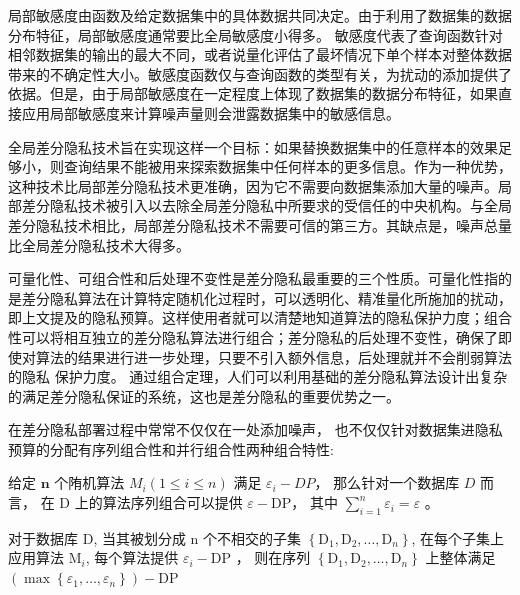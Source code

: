 局部敏感度由函数及给定数据集中的具体数据共同决定。由于利用了数据集的数据分布特征，局部敏感度通常要比全局敏感度小得多。
敏感度代表了查询函数针对相邻数据集的输出的最大不同，或者说量化评估了最坏情况下单个样本对整体数据带来的不确定性大小。敏感度函数仅与查询函数的类型有关，为扰动的添加提供了依据。但是，由于局部敏感度在一定程度上体现了数据集的数据分布特征，如果直接应用局部敏感度来计算噪声量则会泄露数据集中的敏感信息。

全局差分隐私技术旨在实现这样一个目标：如果替换数据集中的任意样本的效果足够小，则查询结果不能被用来探索数据集中任何样本的更多信息。作为一种优势，这种技术比局部差分隐私技术更准确，因为它不需要向数据集添加大量的噪声。局部差分隐私技术被引入以去除全局差分隐私中所要求的受信任的中央机构。与全局差分隐私技术相比，局部差分隐私技术不需要可信的第三方。其缺点是，噪声总量比全局差分隐私技术大得多。

可量化性、可组合性和后处理不变性是差分隐私最重要的三个性质。可量化性指的是差分隐私算法在计算特定随机化过程时，可以透明化、精准量化所施加的扰动，即上文提及的隐私预算。这样使用者就可以清楚地知道算法的隐私保护力度；组合性可以将相互独立的差分隐私算法进行组合；差分隐私的后处理不变性，确保了即使对算法的结果进行进一步处理，只要不引入额外信息，后处理就并不会削弱算法的隐私
保护力度。 通过组合定理，人们可以利用基础的差分隐私算法设计出复杂的满足差分隐私保证的系统，这也是差分隐私的重要优势之一。 

在差分隐私部署过程中常常不仅仅在一处添加噪声， 也不仅仅针对数据集进隐私预算的分配有序列组合性和并行组合性两种组合特性:

\begin{theorem}[串行组合]\label{串行组合}
给定 $\mathbf{n}$ 个陏机算法 $M_{i}(1 \leq i \leq n)$ 满足 $\varepsilon_{i}-DP$， 那么针对一个数据库 $D$ 而言， 在 $\mathrm{D}$ 上的算法序列组合可以提供 $\varepsilon-\mathrm{DP}$， 其中 $\sum_{i=1}^{n} \varepsilon_{i}=\varepsilon$ 。
\end{theorem}

\begin{theorem}[并行组合]\label{并行组合}
对于数据库 $\mathrm{D}$, 当其被划分成 $\mathrm{n}$ 个不相交的子集 $\left\{\mathrm{D}_{1}, \mathrm{D}_{2}, \ldots, \mathrm{D}_{n}\right\}$, 在每个子集上应用算法 $\mathrm{M}_{i}$, 每个算法提供 $\varepsilon_{i}-\mathrm{DP}$ ， 则在序列 $\left\{\mathrm{D}_{1}, \mathrm{D}_{2}, \ldots, \mathrm{D}_{n}\right\}$ 上整体满足 $\left(\max \left\{\varepsilon_{1}, \ldots, \varepsilon_{n}\right\}\right)-\mathrm{DP}$
\end{theorem}


